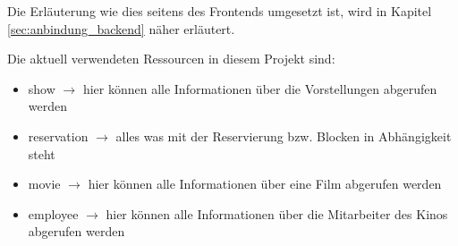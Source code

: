 Die Erläuterung wie dies seitens des Frontends umgesetzt ist, wird in Kapitel \vref{sec:anbindung_backend} näher erläutert.
 

Die aktuell verwendeten Ressourcen in diesem Projekt sind:
\begin{itemize}
	\item show $\rightarrow$ hier können alle Informationen über die Vorstellungen abgerufen werden
	\item reservation $\rightarrow$ alles was mit der Reservierung bzw. Blocken in Abhängigkeit steht 
	\item movie $\rightarrow$ hier können alle Informationen über eine Film abgerufen werden
	\item employee $\rightarrow$ hier können alle Informationen über die Mitarbeiter des Kinos abgerufen werden
\end{itemize} 